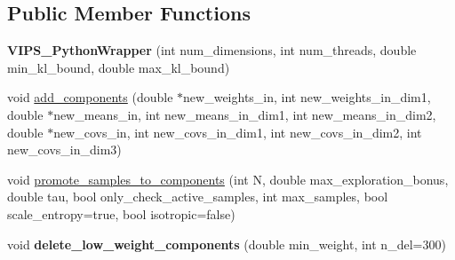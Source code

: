 \subsection*{Public Member Functions}
\begin{DoxyCompactItemize}
\item 
{\bfseries V\+I\+P\+S\+\_\+\+Python\+Wrapper} (int num\+\_\+dimensions, int num\+\_\+threads, double min\+\_\+kl\+\_\+bound, double max\+\_\+kl\+\_\+bound)\hypertarget{classVIPS__PythonWrapper_ad5cc2281cd1d3abcd50618535c25b635}{}\label{classVIPS__PythonWrapper_ad5cc2281cd1d3abcd50618535c25b635}

\item 
void \hyperlink{classVIPS__PythonWrapper_a0a51f6e59a9b843e4a21262e4c119bbd}{add\+\_\+components} (double $\ast$new\+\_\+weights\+\_\+in, int new\+\_\+weights\+\_\+in\+\_\+dim1, double $\ast$new\+\_\+means\+\_\+in, int new\+\_\+means\+\_\+in\+\_\+dim1, int new\+\_\+means\+\_\+in\+\_\+dim2, double $\ast$new\+\_\+covs\+\_\+in, int new\+\_\+covs\+\_\+in\+\_\+dim1, int new\+\_\+covs\+\_\+in\+\_\+dim2, int new\+\_\+covs\+\_\+in\+\_\+dim3)
\item 
void \hyperlink{classVIPS__PythonWrapper_a8b17b5e96e7535358411ab8adcbcd934}{promote\+\_\+samples\+\_\+to\+\_\+components} (int N, double max\+\_\+exploration\+\_\+bonus, double tau, bool only\+\_\+check\+\_\+active\+\_\+samples, int max\+\_\+samples, bool scale\+\_\+entropy=true, bool isotropic=false)
\item 
void {\bfseries delete\+\_\+low\+\_\+weight\+\_\+components} (double min\+\_\+weight, int n\+\_\+del=300)\hypertarget{classVIPS__PythonWrapper_aeff812cf743741fcfce1871331ea14fb}{}\label{classVIPS__PythonWrapper_aeff812cf743741fcfce1871331ea14fb}


\end{DoxyCompactItemize}

